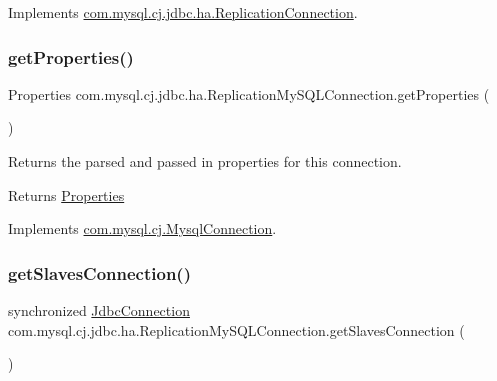 Implements \mbox{\hyperlink{interfacecom_1_1mysql_1_1cj_1_1jdbc_1_1ha_1_1_replication_connection_ac4c0ab9593304c8a6928e376ac5d78d8}{com.\+mysql.\+cj.\+jdbc.\+ha.\+Replication\+Connection}}.

\mbox{\label{classcom_1_1mysql_1_1cj_1_1jdbc_1_1ha_1_1_replication_my_s_q_l_connection_a04a60b0695519e98a4827f90161f52da}} 
\subsubsection{\texorpdfstring{get\+Properties()}{getProperties()}}
{\footnotesize\ttfamily Properties com.\+mysql.\+cj.\+jdbc.\+ha.\+Replication\+My\+S\+Q\+L\+Connection.\+get\+Properties (\begin{DoxyParamCaption}{ }\end{DoxyParamCaption})}

Returns the parsed and passed in properties for this connection.

\begin{DoxyReturn}{Returns}
\mbox{\hyperlink{}{Properties}} 
\end{DoxyReturn}


Implements \mbox{\hyperlink{interfacecom_1_1mysql_1_1cj_1_1_mysql_connection_a1fde8714cc1e2176748fd4f35f0df0d1}{com.\+mysql.\+cj.\+Mysql\+Connection}}.

\mbox{\label{classcom_1_1mysql_1_1cj_1_1jdbc_1_1ha_1_1_replication_my_s_q_l_connection_a088e6456dc0dd8f90f7ded1aed7a6324}} 
\subsubsection{\texorpdfstring{get\+Slaves\+Connection()}{getSlavesConnection()}}
{\footnotesize\ttfamily synchronized \mbox{\hyperlink{interfacecom_1_1mysql_1_1cj_1_1jdbc_1_1_jdbc_connection}{Jdbc\+Connection}} com.\+mysql.\+cj.\+jdbc.\+ha.\+Replication\+My\+S\+Q\+L\+Connection.\+get\+Slaves\+Connection (\begin{DoxyParamCaption}{ }\end{DoxyParamCaption})}



